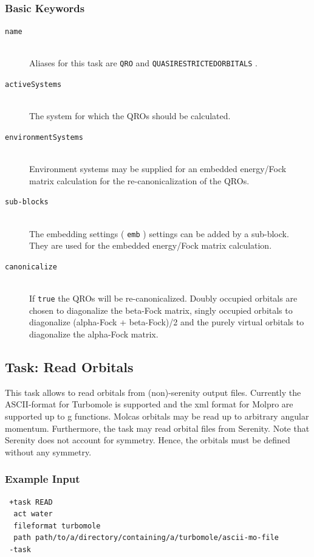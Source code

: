 \documentclass[bibliography=totocnumbered,a4paper,10pt,oneside]{scrbook}
\newcommand{\ttt}[1]{%
  \begingroup\setlength{\fboxsep}{1pt}%
  \colorbox{serenity-green!30}{\texttt{\hspace*{2pt}\vphantom{(g}#1\hspace*{2pt}}}%
  \endgroup
}
\begin{document}
\subsubsection{Basic Keywords}
\begin{description}
 \item [\texttt{name}]\hfill \\
  Aliases for this task are \ttt{QRO} and \ttt{QUASIRESTRICTEDORBITALS}.
 \item [\texttt{activeSystems}]\hfill \\
  The system for which the QROs should be calculated.
 \item [\texttt{environmentSystems}]\hfill \\
  Environment systems may be supplied for an embedded energy/Fock matrix calculation
  for the re-canonicalization of the QROs.
 \item[\texttt{sub-blocks}]\hfill \\
  The embedding settings (\ttt{emb}) settings can be added by a sub-block. They are used for the embedded energy/Fock matrix
  calculation.
 \item [\texttt{canonicalize}]\hfill \\
  If \ttt{true} the QROs will be re-canonicalized. Doubly occupied orbitals are chosen to
  diagonalize the beta-Fock matrix, singly occupied orbitals to diagonalize (alpha-Fock + beta-Fock)/2
  and the purely virtual orbitals to diagonalize the alpha-Fock matrix.
\end{description}

\subsection{Task: Read Orbitals}

This task allows to read orbitals from (non)-serenity output files.
Currently the ASCII-format for Turbomole is supported and the xml format for Molpro are supported up to g functions.
Molcas orbitals may be read up to arbitrary angular momentum.
Furthermore, the task may read orbital files from Serenity.
Note that Serenity does not account for symmetry. Hence, the orbitals must be defined without any symmetry.
\subsubsection{Example Input}
\begin{lstlisting}
 +task READ
  act water
  fileformat turbomole
  path path/to/a/directory/containing/a/turbomole/ascii-mo-file
 -task
\end{lstlisting}
\end{document}
